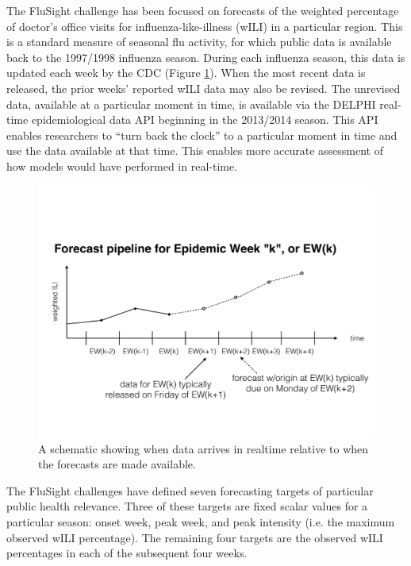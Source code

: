 \documentclass{article}\usepackage[]{graphicx}\usepackage[]{color}
\begin{document}
The FluSight challenge has been focused on forecasts of the weighted percentage of doctor's office visits for influenza-like-illness (wILI) in a particular region. This is a standard measure of seasonal flu activity, for which public data is available back to the 1997/1998 influenza season. During each influenza season, this data is updated each week by the CDC (Figure \ref{fig:timezero-schematic}). When the most recent data is released, the prior weeks' reported wILI data may also be revised. The unrevised data, available at a particular moment in time, is available via the DELPHI real-time epidemiological data API beginning in the 2013/2014 season.\cite{DELPHI} This API enables researchers to ``turn back the clock'' to a particular moment in time and use the data available at that time. This enables more accurate assessment of how models would have performed in real-time. 

\begin{figure}[htbp]
\begin{center}
\includegraphics[width=\textwidth]{static-figures/timezero-sketch.pdf}
\caption{A schematic showing when data arrives in realtime relative to when the forecasts are made available.}
\label{fig:timezero-schematic}
\end{center}
\end{figure}


The FluSight challenges have defined seven forecasting targets of particular public health relevance. Three of these targets are fixed scalar values for a particular season: onset week, peak week, and peak intensity (i.e. the maximum observed wILI percentage). The remaining four targets are the observed wILI percentages in each of the subsequent four weeks. 
\end{document}
